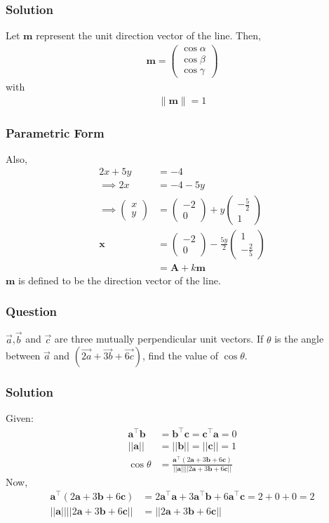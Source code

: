\documentclass{beamer}
\providecommand{\brak}[1]{\ensuremath{\left(#1\right)}}
\theoremstyle{remark}
\providecommand{\norm}[1]{\lVert#1\rVert}
\newcommand{\myvec}[1]{\ensuremath{\begin{pmatrix}#1\end{pmatrix}}}
\let\vec\mathbf
\begin{document}
%
\begin{frame}
\frametitle{Solution}
Let $\vec{m}$ represent the unit direction vector of the line.  Then,
\begin{align}
    \vec{m} = \myvec{
        \cos{\alpha} \\
        \cos{\beta}\\
        \cos{\gamma}
    }
\end{align}
with 
\begin{align}
	\norm{\vec{m}} =  1
\end{align}
\end{frame}
%
\begin{frame}
\frametitle{Parametric Form}
Also, 
\begin{align}
    2x + 5y &= -4\\
    \implies 2x &= -4 -5y
    \\
    \implies
    \myvec{
        x\\
        y
    } &= \myvec{
        -2\\
        0
    } + y\myvec{
        -\frac{5}{2}\\
        1
    }\\
    \vec{x} &= \myvec{
        -2\\
        0
    } -\frac{5y}{2}\myvec{
        1\\
        -\frac{2}{5}
    }\\
    &= \vec{A} + k\vec{m} \label{11}
\end{align}
$\vec{m}$ is defined to be the direction vector of the line.
\end{frame}
%
\begin{frame}
\frametitle{Question }
$\overrightarrow{a}$,$\overrightarrow{b}$ and $\overrightarrow{c}$ are three mutually perpendicular unit vectors. If $\theta$ is the angle between $\overrightarrow{a}$ and $\brak{\overrightarrow{2a}+\overrightarrow{3b}+\overrightarrow{6c}}$, find the value of $\cos{\theta}$. 
\end{frame}
%
\begin{frame}
\frametitle{Solution}
Given:
\begin{align}
    \vec{a}^{\top}\vec{b} &=  \vec{b}^{\top}\vec{c} =  \vec{c}^{\top}\vec{a} = 0\\
    \lvert \lvert \vec{a} \rvert \rvert 
&= \lvert \lvert \vec{b} \rvert \rvert = \lvert \lvert \vec{c} \rvert \rvert = 1\\
\cos{\theta} &= \frac{\vec{a}^{\top}\brak{2\vec{a}+3\vec{b}+6\vec{c}}}{\lvert \lvert \vec{a} \rvert \rvert \lvert \lvert 2\vec{a} + 3\vec{b} + 6\vec{c} \rvert \rvert}
\end{align}
Now,
\begin{align}
    \vec{a}^{\top}\brak{2\vec{a}+3\vec{b}+6\vec{c}} &= 2\vec{a}^{\top}\vec{a} + 3\vec{a}^{\top}\vec{b} + 6\vec{a}^{\top}\vec{c} = 2 + 0 + 0 = 2\\
    \lvert \lvert \vec{a} \rvert \rvert \lvert \lvert 2\vec{a} + 3\vec{b} + 6\vec{c} \rvert \rvert &= \lvert \lvert 2\vec{a} + 3\vec{b} + 6\vec{c} \rvert \rvert
    \end{align}
\end{frame}
\end{document}
